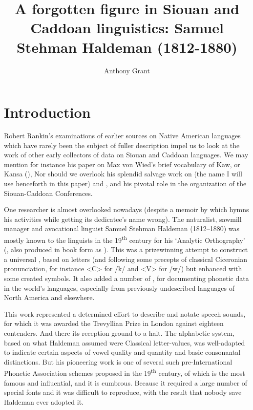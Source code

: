 \documentclass[output=paper]{LSP/langsci}
\author{Anthony Grant}
\title{A forgotten figure in {Siouan} and {Caddoan} linguistics:  {Samuel Stehman Haldeman} (1812-1880)}
\begin{document}
\section{Introduction}

Robert Rankin's examinations of earlier sources on Native American languages which have rarely been the subject of fuller description impel us to look at the work of other early collectors of data on Siouan and Caddoan languages. We may mention for instance his paper on Max von Wied's \citeyearpar{Maximilian18391841} brief vocabulary of Kaw,  or Kansa  (\citealt{Rankin1994}), Nor should we overlook his splendid salvage work on  (the name I will use henceforth in this paper) and , and his pivotal role in the organization of the Siouan-Caddoan Conferences.

One researcher is almost overlooked nowadays (despite a memoir by \citealt{Lesley1881} which hymns his activities while getting its dedicatee's name wrong). The naturalist, sawmill manager and avocational linguist Samuel Stehman Haldeman (1812--1880)  was mostly known to the linguists in the 19\textsuperscript{th} century for his `Analytic Orthography' (\citealt{Haldeman1859}, also produced in book form as \citealt{Haldeman1860}). This was a prizewinning attempt to construct a  universal , based on  letters (and following some precepts of classical Ciceronian  pronunciation, for instance <C> for /k/ and <V> for /w/) but enhanced with some created symbols. It also added a number of , for documenting phonetic data in the world's languages, especially from previously undescribed languages of North America and elsewhere.

This work represented a determined effort to describe and notate speech sounds, for which it was awarded the Trevyllian Prize in London against eighteen contenders. And there its reception ground to a halt. The alphabetic system, based on what Haldeman assumed were Classical  letter-values, was well-adapted to indicate certain aspects of vowel quality and quantity and basic consonantal distinctions. But his pioneering work is one of several such pre-International Phonetic Association  schemes proposed in the 19\textsuperscript{th} century, of which \citet{Lepsius1863} is the most famous and influential, and it is cumbrous.  Because it required a large number of special fonts and  it was difficult to reproduce, with the result that nobody save Haldeman ever adopted it.    
\end{document}
